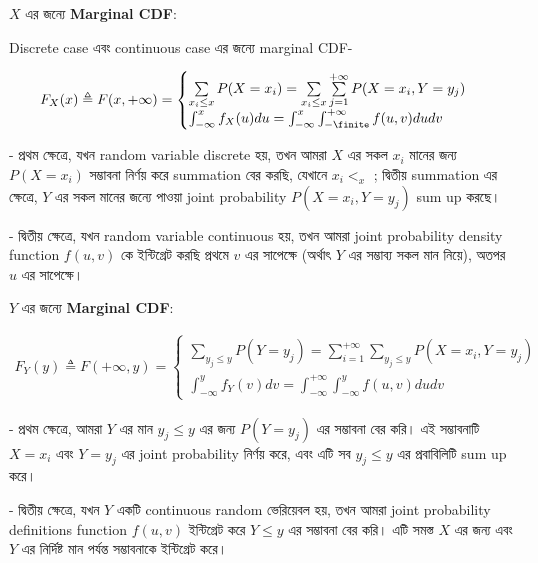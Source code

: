 \documentclass[graybox, envcountchap, twocolumn]{styles/svmult}
\begin{document}
$X$ {\bengalifont এর জন্যে } \textbf{Marginal CDF}:

{\bengalifont Discrete case এবং continuous case এর জন্যে marginal CDF-  }

\begin{equation}\begin{split}
F_X(x) \triangleq F(x,+\infty) = 
\begin{cases}
\sum\limits_{x_i \leq x} P(X=x_i) = \sum\limits_{x_i \leq x} \sum\limits_{j=1}^{+\infty} P(X=x_i,Y=y_j) \\
\int_{-\infty}^{x} f_X(u)du = \int_{-\infty}^{x} \int_{-\finite}^{+\infty} f(u, v) du dv
\end{cases}
\end{split}
\end{equation}


    - {\bengalifont প্রথম ক্ষেত্রে, যখন random variable discrete হয়, তখন আমরা $X$ এর সকল  $x_i$ মানের জন্য $P(X=x_i)$ সম্ভাবনা নির্ণয় করে summation বের করছি, যেখানে $x_i <_ x $ ; দ্বিতীয় summation এর ক্ষেত্রে, $Y$ এর সকল মানের জন্যে পাওয়া joint probability $P(X=x_i,Y=y_j)$ sum up করছে।   }

    - {\bengalifont দ্বিতীয় ক্ষেত্রে, যখন random variable continuous হয়, তখন আমরা joint probability density function $f(u,v)$ কে ইন্টিগ্রেট করছি প্রথমে $v$ এর সাপেক্ষে (অর্থাৎ $Y$ এর সম্ভাব্য সকল মান নিয়ে), অতপর $u$ এর সাপেক্ষে।}

$Y$ {\bengalifont এর জন্যে } \textbf{Marginal CDF}:

\begin{equation}\begin{split}
F_Y(y) \triangleq F(+\infty, y) = 
\begin{cases}
\sum\limits_{y_j \leq y} P(Y=y_j) = \sum\limits_{i=1}^{+\infty} \sum\limits_{y_j \leq y} P(X=x_i,Y=y_j) \\
\int_{-\infty}^{y} f_Y(v) dv = \int_{-\infty}^{+\infty} \int_{-\infty}^{y} f(u, v) du dv
\end{cases}
\end{split}\end{equation}

-   {\bengalifont প্রথম ক্ষেত্রে, আমরা $Y$ এর মান $y_j \leq y$ এর জন্য $P(Y=y_j)$ এর সম্ভাবনা বের করি। এই সম্ভাবনাটি $X=x_i$ এবং $Y=y_j$ এর joint probability নির্ণয় করে, এবং এটি সব $y_j \leq y$ এর প্রবাবিলিটি sum  up করে। }

-   {\bengalifont দ্বিতীয় ক্ষেত্রে, যখন $Y$ একটি continuous random ভেরিয়েবল হয়, তখন আমরা joint  probability definitions function  $f(u, v)$ ইন্টিগ্রেট করে $Y \leq y$ এর সম্ভাবনা বের করি। এটি সমস্ত $X$ এর জন্য এবং $Y$ এর নির্দিষ্ট মান পর্যন্ত সম্ভাবনাকে ইন্টিগ্রেট করে।}
\end{document}
